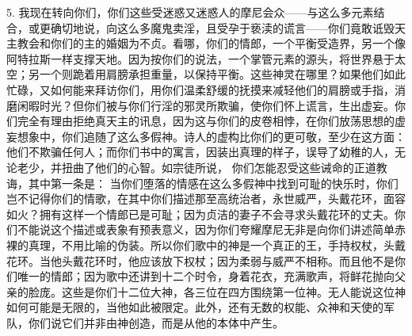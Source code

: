 5. 我现在转向你们，你们这些受迷惑又迷惑人的摩尼会众——与这么多元素结合，或更确切地说，向这么多魔鬼卖淫，且受孕于亵渎的谎言——你们竟敢诋毁天主教会和你们的主的婚姻为不贞。看哪，你们的情郎，一个平衡受造界，另一个像阿特拉斯一样支撑天地。因为按你们的说法，一个掌管元素的源头，将世界悬于太空；另一个则跪着用肩膀承担重量，以保持平衡。这些神灵在哪里？如果他们如此忙碌，又如何能来拜访你们，用你们温柔舒缓的抚摸来减轻他们的肩膀或手指，消磨闲暇时光？但你们被与你们行淫的邪灵所欺骗，使你们怀上谎言，生出虚妄。你们完全有理由拒绝真天主的讯息，因为这与你们的皮卷相悖，在你们放荡思想的虚妄想象中，你们追随了这么多假神。诗人的虚构比你们的更可敬，至少在这方面：他们不欺骗任何人；而你们书中的寓言，因装出真理的样子，误导了幼稚的人，无论老少，并扭曲了他们的心智。如宗徒所说， 你们怎能忍受这些诫命的正道教诲，其中第一条是： 当你们堕落的情感在这么多假神中找到可耻的快乐时，你们岂不记得你们的情歌，在其中你们描述那至高统治者，永世威严，头戴花环，面容如火？拥有这样一个情郎已是可耻；因为贞洁的妻子不会寻求头戴花环的丈夫。你们不能说这个描述或表象有预表意义，因为你们夸耀摩尼无非是向你们讲述简单赤裸的真理，不用比喻的伪装。所以你们歌中的神是一个真正的王，手持权杖，头戴花环。当他头戴花环时，他应该放下权杖；因为柔弱与威严不相称。而且他不是你们唯一的情郎；因为歌中还讲到十二个时令，身着花衣，充满歌声，将鲜花抛向父亲的脸庞。这些是你们十二位大神，各三位在四方围绕第一位神。无人能说这位神如何可能是无限的，当他如此被限定。此外，还有无数的权能、众神和天使的军队，你们说它们并非由神创造，而是从他的本体中产生。\par

